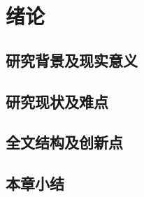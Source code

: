
\chapter{绪论}
\label{chap:introduction}

 

\section{研究背景及现实意义}

 

\section{研究现状及难点}


\section{全文结构及创新点}

\section{本章小结}